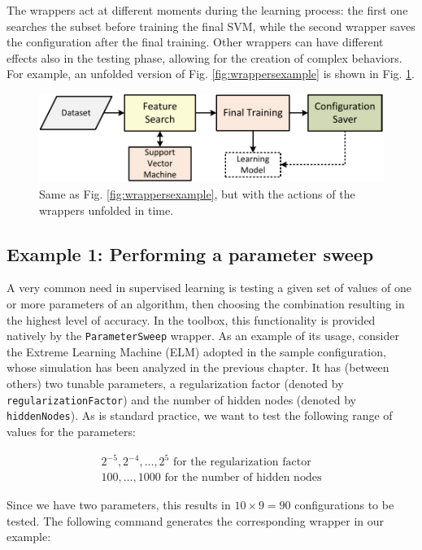 \noindent The wrappers act at different moments during the learning process: the first one searches the subset before training the final SVM, while the second wrapper saves the configuration after the final training. Other wrappers can have different effects also in the testing phase, allowing for the creation of complex behaviors. For example, an unfolded version of Fig. \ref{fig:wrappersexample} is shown in Fig. \ref{fig:wrappersexample_unfolded}.

\begin{figure}[t]
\centering
\includegraphics[scale=0.6]{./images/WrappersExampleUnfolded}
\caption{Same as Fig. \ref{fig:wrappersexample}, but with the actions of the wrappers unfolded in time.}
\label{fig:wrappersexample_unfolded}
\end{figure}

\subsection{Example 1: Performing a parameter sweep}
\label{sec:parametersweep}

A very common need in supervised learning is testing a given set of values of one or more parameters of an algorithm, then choosing the combination resulting in the highest level of accuracy. In the toolbox, this functionality is provided natively by the \verb|ParameterSweep| wrapper. As an example of its usage, consider the Extreme Learning Machine (ELM) adopted in the sample configuration, whose simulation has been analyzed in the previous chapter. It has (between others) two tunable parameters, a regularization factor (denoted by \verb|regularizationFactor|) and the number of hidden nodes (denoted by \verb|hiddenNodes|). As is standard practice, we want to test the following range of values for the parameters:

\begin{eqnarray}
2^{-5}, 2^{-4}, \dots, 2^{5} \text{ for the regularization factor}\\
100, \dots, 1000 \text{ for the number of hidden nodes}
\end{eqnarray}

\noindent Since we have two parameters, this results in $10 \times 9 = 90$ configurations to be tested. The following command generates the corresponding wrapper in our example:

